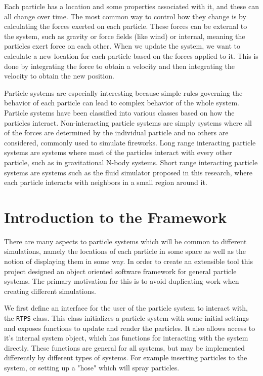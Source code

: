 Each particle has a location and some properties associated with it, and these
can all change over time. The most common way to control how they change is by
calculating the forces exerted on each particle. These forces can be external
to the system, such as gravity or force fields (like wind) or internal, meaning
the particles exert force on each other. When we update the system, we want to
calculate a new location for each particle based on the forces applied to it.
This is done by integrating the force to obtain a velocity and then integrating
the velocity to obtain the new position.


Particle systems are especially interesting because simple rules governing the
behavior of each particle can lead to complex behavior of the whole system.
Particle systems have been classified into various classes based on how the
particles interact. Non-interacting particle systems are simply systems where
all of the forces are determined by the individual particle and no others are
considered, commonly used to simulate fireworks. Long range interacting
particle systems are systems where most of the particles interact with every
other particle, such as in gravitational N-body systems. Short range
interacting particle systems are systems such as the fluid simulator proposed
in this research, where each particle interacts with neighbors in a small
region around it. \cite{Knowles2009} 




\section{Introduction to the Framework}

There are many aspects to particle systems which will be common to different
simulations, namely the locations of each particle in some space as well as the
notion of displaying them in some way. In order to create an extensible tool 
this project designed an object oriented software framework for general particle systems.
The primary motivation for this is to avoid duplicating work when creating
different simulations.


We first define an interface for the user of the particle system to interact
with, the \verb|RTPS| class. This class initializes a particle system with some
initial settings and exposes functions to update and render the particles. It
also allows access to it's internal system object, which has functions for
interacting with the system directly. These functions are general for all
systems, but may be implemented differently by different types of systems. For
example inserting particles to the system, or setting up a "hose" which will
spray particles.


